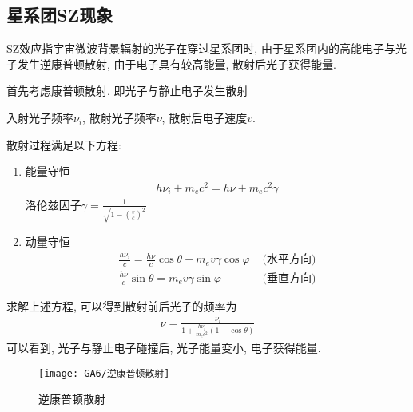 \subsection{星系团SZ现象}
SZ效应指宇宙微波背景辐射的光子在穿过星系团时, 由于星系团内的高能电子与光子发生逆康普顿散射, 由于电子具有较高能量, 散射后光子获得能量. 

首先考虑康普顿散射, 即光子与静止电子发生散射
\begin{figure}[!htb]
    \centering
\end{figure}
入射光子频率$\nu_i$, 散射光子频率$\nu$, 散射后电子速度$v$. 

散射过程满足以下方程:
\begin{enumerate}
    \item 能量守恒
    \begin{align*}
        h\nu_i +m_e c^2=h\nu + m_e c^2 \gamma
    \end{align*}
    洛伦兹因子$\displaystyle\gamma=\frac{1}{\sqrt{1-\left( \frac{v}{c} \right)^2}}$ 
    \item 动量守恒
    \begin{align*}
        \frac{h\nu_i}{c}=\frac{h\nu}{c}\cos\theta +m_e v\gamma \cos\varphi &\text{ (水平方向)} \\
        \frac{h\nu}{c}\sin\theta=m_e v\gamma \sin\varphi &\text{ (垂直方向)}
    \end{align*}
\end{enumerate}

求解上述方程, 可以得到散射前后光子的频率为
\begin{align*}
    \nu=\frac{\nu_i}{1+\frac{h\nu_i}{m_e c^2}(1-\cos\theta)}
\end{align*}
可以看到, 光子与静止电子碰撞后, 光子能量变小, 电子获得能量. 

\begin{figure}[!htb]
    \centering
    \texttt{[image: GA6/逆康普顿散射]}
    \caption{逆康普顿散射}
\end{figure}

